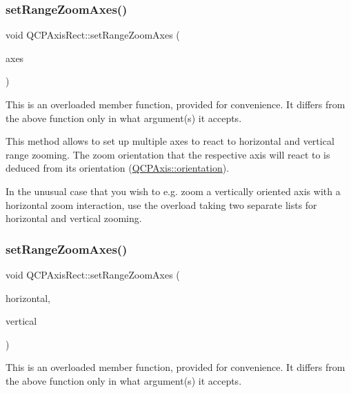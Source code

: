 \subsubsection{\texorpdfstring{setRangeZoomAxes()}{setRangeZoomAxes()}\hspace{0.1cm}{\footnotesize\ttfamily [2/3]}}
{\footnotesize\ttfamily void Q\+C\+P\+Axis\+Rect\+::set\+Range\+Zoom\+Axes (\begin{DoxyParamCaption}\item[{Q\+List$<$ \mbox{\hyperlink{class_q_c_p_axis}{Q\+C\+P\+Axis}} $\ast$ $>$}]{axes }\end{DoxyParamCaption})}

This is an overloaded member function, provided for convenience. It differs from the above function only in what argument(s) it accepts.

This method allows to set up multiple axes to react to horizontal and vertical range zooming. The zoom orientation that the respective axis will react to is deduced from its orientation (\mbox{\hyperlink{class_q_c_p_axis_ab988ef4538e2655bb77bd138189cd42e}{Q\+C\+P\+Axis\+::orientation}}).

In the unusual case that you wish to e.\+g. zoom a vertically oriented axis with a horizontal zoom interaction, use the overload taking two separate lists for horizontal and vertical zooming. \mbox{\label{class_q_c_p_axis_rect_ae29d6e9e54ebd981769c986e498ae118}} 
\subsubsection{\texorpdfstring{setRangeZoomAxes()}{setRangeZoomAxes()}\hspace{0.1cm}{\footnotesize\ttfamily [3/3]}}
{\footnotesize\ttfamily void Q\+C\+P\+Axis\+Rect\+::set\+Range\+Zoom\+Axes (\begin{DoxyParamCaption}\item[{Q\+List$<$ \mbox{\hyperlink{class_q_c_p_axis}{Q\+C\+P\+Axis}} $\ast$ $>$}]{horizontal,  }\item[{Q\+List$<$ \mbox{\hyperlink{class_q_c_p_axis}{Q\+C\+P\+Axis}} $\ast$ $>$}]{vertical }\end{DoxyParamCaption})}

This is an overloaded member function, provided for convenience. It differs from the above function only in what argument(s) it accepts.

